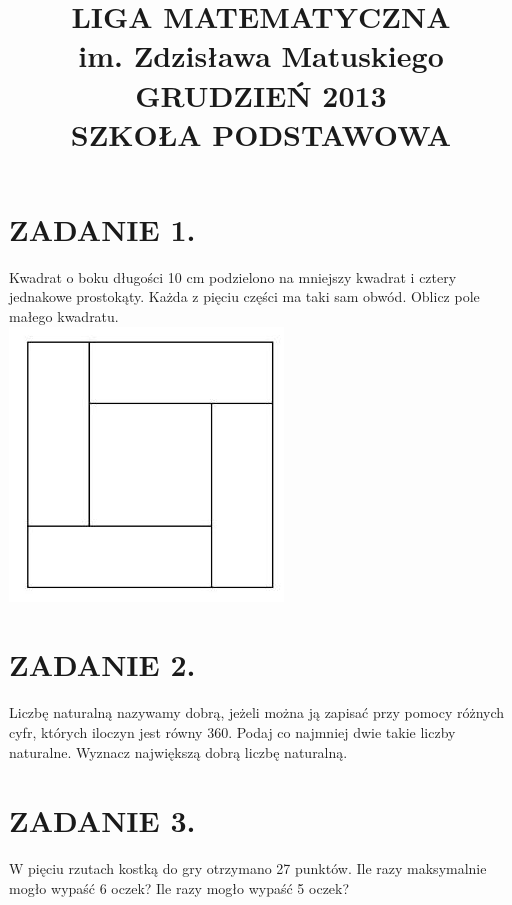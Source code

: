 \documentclass[10pt]{article}
\title{LIGA MATEMATYCZNA \\
 im. Zdzisława Matuskiego \\
 GRUDZIEŃ 2013 \\
 SZKOŁA PODSTAWOWA }
\author{}
\date{}
\begin{document}
\maketitle
\section*{ZADANIE 1.}
Kwadrat o boku długości 10 cm podzielono na mniejszy kwadrat i cztery jednakowe prostokąty. Każda z pięciu części ma taki sam obwód. Oblicz pole małego kwadratu.\\
\includegraphics[max width=\textwidth, center]{2024_11_21_51f6fb0dd520436b83ddg-1}

\section*{ZADANIE 2.}
Liczbę naturalną nazywamy dobrą, jeżeli można ją zapisać przy pomocy różnych cyfr, których iloczyn jest równy 360. Podaj co najmniej dwie takie liczby naturalne. Wyznacz największą dobrą liczbę naturalną.

\section*{ZADANIE 3.}
W pięciu rzutach kostką do gry otrzymano 27 punktów. Ile razy maksymalnie mogło wypaść 6 oczek? Ile razy mogło wypaść 5 oczek?
\end{document}
